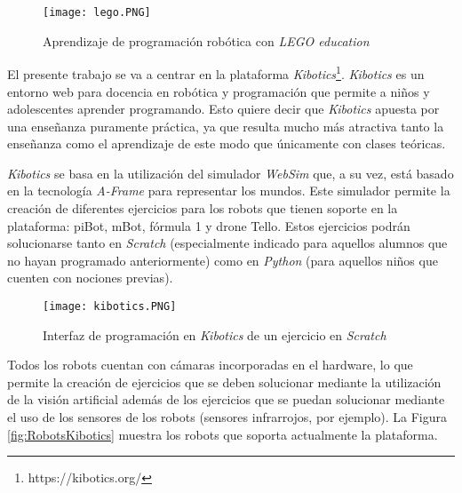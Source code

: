 \begin{figure}[h!]
    \centering
    \texttt{[image: lego.PNG]}
    \caption{Aprendizaje de programación robótica con \textit{LEGO education}}
    \label{fig:lego}
\end{figure}

El presente trabajo se va a centrar en la plataforma \textit{Kibotics}\footnote{https://kibotics.org/}. \textit{Kibotics} es un entorno web para docencia en robótica y programación que permite a niños y adolescentes aprender programando. Esto quiere decir que \textit{Kibotics}  apuesta por una enseñanza puramente práctica, ya que resulta mucho más atractiva tanto la enseñanza como el aprendizaje de este modo que únicamente con clases teóricas. \newline

\textit{Kibotics}  se basa en la utilización del simulador \textit{WebSim}  que, a su vez, está basado en la tecnología \textit{A-Frame}  para representar los mundos. Este simulador permite la creación de diferentes ejercicios para los robots que tienen soporte en la plataforma: piBot, mBot, fórmula 1 y drone Tello. Estos ejercicios podrán solucionarse tanto en \textit{Scratch} (especialmente indicado para aquellos alumnos que no hayan programado anteriormente) como en \textit{Python} (para aquellos niños que cuenten con nociones previas). \newline

\begin{figure}[h!]
    \centering
    \texttt{[image: kibotics.PNG]}
    \caption{Interfaz de programación en \textit{Kibotics} de un ejercicio en \textit{Scratch}}
    \label{fig:kibotics}
\end{figure}


Todos los robots cuentan con cámaras incorporadas en el hardware, lo que permite la creación de ejercicios que se deben solucionar mediante la utilización de la visión artificial además de los ejercicios que se puedan solucionar mediante el uso de los sensores de los robots (sensores infrarrojos, por ejemplo). La Figura \ref{fig:RobotsKibotics} muestra los robots que soporta actualmente la plataforma.\newline


